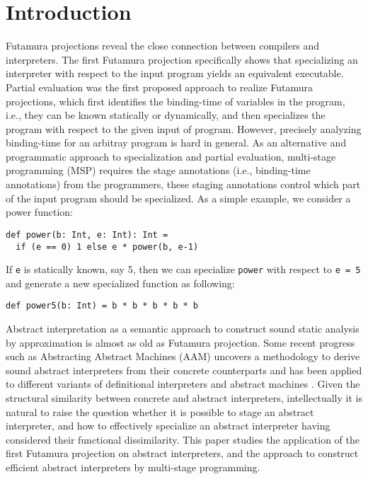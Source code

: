 \section{Introduction}


Futamura projections \cite{Futamura1999, futamura1971partial} reveal the close connection between 
compilers and interpreters. 
The first Futamura projection specifically shows that specializing an interpreter with respect to the input 
program yields an equivalent executable.
Partial evaluation \cite{DBLP:books/daglib/0072559} was the first proposed approach to realize Futamura projections,
which first identifies the binding-time of variables in the program, i.e., they can be known statically or dynamically, 
and then specializes the program with respect to the given input of program.
However, precisely analyzing binding-time for an arbitray program is hard in general. As an alternative and programmatic
approach to specialization and partial evaluation, multi-stage programming (MSP) \cite{taha1999multi, DBLP:conf/pepm/TahaS97} 
requires the stage annotations (i.e., binding-time annotations) from the programmers, these staging annotations 
control which part of the input program should be specialized.
As a simple example, we consider a power function: 
\begin{lstlisting}
def power(b: Int, e: Int): Int = 
  if (e == 0) 1 else e * power(b, e-1)
\end{lstlisting}
If \texttt{e} is statically known, say 5, then we can specialize \texttt{power} with respect to \texttt{e = 5} and 
generate a new specialized function as following:
\begin{lstlisting}
def power5(b: Int) = b * b * b * b * b
\end{lstlisting}

Abstract interpretation \cite{DBLP:conf/popl/CousotC77} as a semantic approach to construct sound static analysis 
by approximation is almost as old as Futamura projection.
Some recent progress such as Abstracting Abstract Machines (AAM) uncovers a methodology to derive sound abstract interpreters 
from their concrete counterparts and has been applied to different variants of definitional interpreters and abstract machines
\cite{DBLP:journals/jfp/HornM12, DBLP:conf/icfp/HornM10, DBLP:journals/pacmpl/DaraisLNH17}.
Given the structural similarity between concrete and abstract interpreters, intellectually 
it is natural to raise the question whether it is possible to stage an abstract interpreter, and how 
to effectively specialize an abstract interpreter having considered their functional dissimilarity. 
This paper studies the application of the first Futamura projection on abstract interpreters, 
and the approach to construct efficient abstract interpreters by multi-stage programming.

